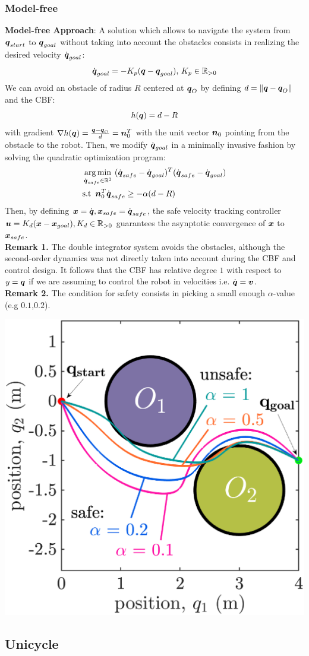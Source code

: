 \subsubsection{Model-free}
\textbf{Model-free Approach}:
A solution which allows to navigate the system from ${\boldsymbol{q}}_{start}$ to ${\boldsymbol{q}}_{goal}$ without taking into account the obstacles consists in realizing the desired velocity $\dot{{\boldsymbol{q}}}_{goal}$:   
\begin{equation}
    \dot{{\boldsymbol{q}}}_{goal}=-K_p({\boldsymbol{q}} - {\boldsymbol{q}}_{goal}),\,K_p\in\mathbb{R}_{>0}
\end{equation}
 We can avoid an obstacle of radius $R$ centered at ${\boldsymbol{q}}_O$ by defining $d = \lVert {\boldsymbol{q}}-{\boldsymbol{q}}_O \rVert$ and the CBF:
\begin{equation}
h({\boldsymbol{q}})=d-R
\end{equation}
with gradient $\nabla h({\boldsymbol{q}}) = \frac{{\boldsymbol{q}}-{\boldsymbol{q}}_O}{d} = \boldsymbol{n}_0^T$ with the unit vector $\boldsymbol{n}_0$ pointing from the obstacle to the robot. Then, we modify $\dot{{\boldsymbol{q}}}_{goal}$ in a minimally invasive fashion by solving the quadratic optimization program:
\begin{align}
    &\operatorname*{arg\,min}_{\dot{{\boldsymbol{q}}}_{safe} \in \mathbb{R}^2} \,\,(\dot{{\boldsymbol{q}}}_{safe}-\dot{{\boldsymbol{q}}}_{goal})^T(\dot{{\boldsymbol{q}}}_{safe}-\dot{{\boldsymbol{q}}}_{goal}) \notag\\
    &\mathrm{s.t} \,\,\, \boldsymbol{n}_0^T \dot{{\boldsymbol{q}}}_{safe}\geq -\alpha(d-R)
\end{align}
Then, by defining $\boldsymbol{x} = \dot{{\boldsymbol{q}}}, \boldsymbol{x}_{safe}=\dot{{\boldsymbol{q}}}_{safe}$, the safe velocity tracking controller $\boldsymbol{u} = K_d (\boldsymbol{x} - \boldsymbol{x}_{goal}), K_d \in \mathbb{R}_{>0} $ guarantees the asynptotic convergence of $\boldsymbol{x}$ to $\boldsymbol{x}_{safe}$. \\
\textbf{Remark 1.} The double integrator system avoids the obstacles, although the second-order dynamics was not directly taken into account during the CBF and control design. It follows that the CBF has relative degree $1$ with respect to $y = {\boldsymbol{q}}$ if we are assuming to control the robot in velocities i.e. $\dot{{\boldsymbol{q}}}=\boldsymbol{v}$. \\
\textbf{Remark 2.} The condition for safety consists in picking a small enough $\alpha$-value (e.g $0.1$,$0.2$).

\includegraphics[scale=0.65]{figprint.eps}\\
\subsection{Unicycle}